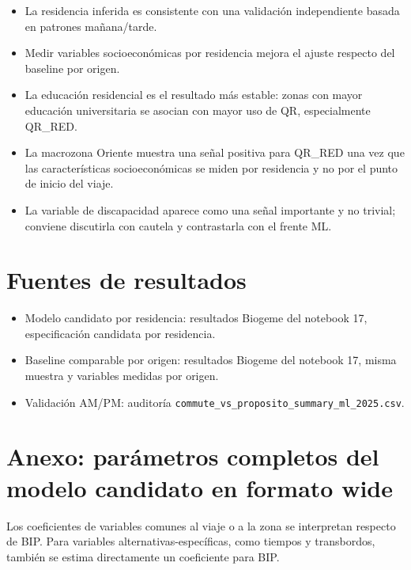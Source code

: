 \documentclass[11pt,letterpaper]{article}
\begin{document}
\begin{itemize}
    \item La residencia inferida es consistente con una validación independiente basada en patrones mañana/tarde.
    \item Medir variables socioeconómicas por residencia mejora el ajuste respecto del baseline por origen.
    \item La educación residencial es el resultado más estable: zonas con mayor educación universitaria se asocian con mayor uso de QR, especialmente QR\_RED.
    \item La macrozona Oriente muestra una señal positiva para QR\_RED una vez que las características socioeconómicas se miden por residencia y no por el punto de inicio del viaje.
    \item La variable de discapacidad aparece como una señal importante y no trivial; conviene discutirla con cautela y contrastarla con el frente ML.
\end{itemize}

\section{Fuentes de resultados}

\begin{itemize}
    \item Modelo candidato por residencia: resultados Biogeme del notebook 17, especificación candidata por residencia.
    \item Baseline comparable por origen: resultados Biogeme del notebook 17, misma muestra y variables medidas por origen.
    \item Validación AM/PM: auditoría \texttt{commute\_vs\_proposito\_summary\_ml\_2025.csv}.
\end{itemize}

\appendix
\section{Anexo: parámetros completos del modelo candidato en formato wide}

Los coeficientes de variables comunes al viaje o a la zona se interpretan respecto de BIP. Para variables alternativas-específicas, como tiempos y transbordos, también se estima directamente un coeficiente para BIP.
\end{document}
